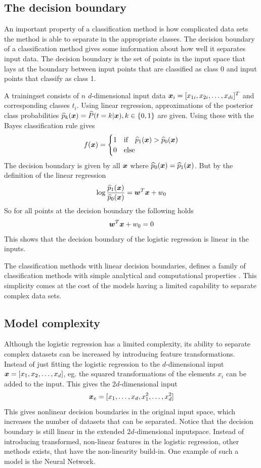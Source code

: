 \subsection{The decision boundary}
An important property of a classification method is how complicated data sets the method is able to separate in the appropriate classes. The decision boundary of a classification method gives some imformation about how well it separates input data. The decision boundary is the set of points in the input space that lays at the boundary between input points that are classified as class 0 and input points that classify as class 1.
\begin{Exa}
    A trainingset consists of $n$ $d$-dimensional input data $\boldsymbol{x}_i=[x_{1i}, x_{2i}, \dots, x_{di}]^T$ and corresponding classes $t_i$. Using linear regression, approximations of the posterior class probabilities $\widehat{p}_k(\boldsymbol{x})=\widehat{P}(t=k|\boldsymbol{x}), k\in\{0,1\}$ are given. Using these with the Bayes classification rule gives
    \[
        f(\boldsymbol{x}) = \begin{cases}
            1 & \text{if}\quad \widehat{p}_1(\boldsymbol{x})>\widehat{p}_0(\boldsymbol{x}) \\
            0 & \text{else}
        \end{cases}
    \]
    The decision boundary is given by all $\boldsymbol{x}$ where $\widehat{p}_0(\boldsymbol{x})=\widehat{p}_1(\boldsymbol{x})$. But by the definition of the linear regression
    \[
        \log\frac{\widehat{p}_1(\boldsymbol{x})}{\widehat{p}_0(\boldsymbol{x})} = \boldsymbol{w}^T\boldsymbol{x}+w_0
    \]
    So for all points at the decision boundary the following holds
    \[
        \boldsymbol{w}^T\boldsymbol{x}+w_0 = 0
    \]
    This shows that the decision boundary of the logistic regression is linear in the inputs.
\end{Exa}
The classification methods with linear decision boundaries, defines a family of classification methods with simple analytical and computational properties \citep[p.179]{bishop}. This simplicity comes at the cost of the models having a limited capability to separate complex data sets. 

\subsection{Model complexity}\label{sec:logistic-complexity}
Although the logistic regression has a limited complexity, its ability to separate complex datasets can be increased by introducing feature transformations. Instead of just fitting the logistic regression to the $d$-dimensional input $\boldsymbol{x}=[x_1, x_2, \dots, x_d]$, eg. the squared transformations of the elements $x_i$ can be added to the input. This gives the $2d$-dimensional input 
\[
    \boldsymbol{x}_e = [x_1, \dots, x_d, x_1^2, \dots, x_d^2]
\]
This gives nonlinear decision boundaries in the original input space, which increases the number of datasets that can be separated. Notice that the decision boundary is still linear in the extended $2d$-dimensional inputspace. Instead of introducing transformed, non-linear features in the logistic regression, other methods exists, that have the non-linearity build-in. One example of such a model is the Neural Network.


